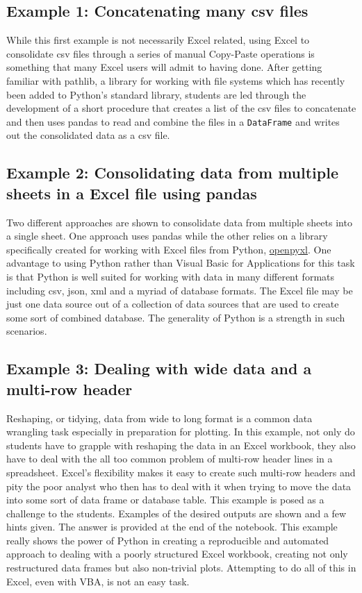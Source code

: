 \documentclass[ited,blindrev]{informs3}              %
\newcommand{\code}[1]{\texttt{#1}}
\begin{document}
\subsection{Example 1: Concatenating many csv files}

While this first example is not necessarily Excel related, using Excel to consolidate csv files through a series of manual Copy-Paste operations is something that many Excel users will admit to having done. After getting familiar with pathlib, a library for working with file systems which has recently been added to Python's standard library, students are led through the development of a short procedure that creates a list of the csv files to concatenate and then uses pandas to read and combine the files in a \code{DataFrame} and writes out the consolidated data as a csv file.

\subsection{Example 2: Consolidating data from multiple sheets in a Excel file using pandas}

Two different approaches are shown to consolidate data from multiple sheets into a single sheet. One approach uses pandas while the other relies on a library specifically created for working with Excel files from Python, \href{https://openpyxl.readthedocs.io/en/stable/}{openpyxl}. One advantage to using Python rather than Visual Basic for Applications for this task is that Python is well suited for working with data in many different formats including csv, json, xml and a myriad of database formats. The Excel file may be just one data source out of a collection of data sources that are used to create some sort of combined database. The generality of Python is a strength in such scenarios.

\subsection{Example 3: Dealing with wide data and a multi-row header}

Reshaping, or tidying, data \cite{wickhamTidyData2014} from wide to long format is a common data wrangling task especially in preparation for plotting. In this example, not only do students have to grapple with reshaping the data in an Excel workbook, they also have to deal with the all too common problem of multi-row header lines in a spreadsheet. Excel's flexibility makes it easy to create such multi-row headers and pity the poor analyst who then has to deal with it when trying to move the data into some sort of data frame or database table. This example is posed as a challenge to the students. Examples of the desired outputs are shown and a few hints given. The answer is provided at the end of the notebook. This example really shows the power of Python in creating a reproducible and automated approach to dealing with a poorly structured Excel workbook, creating not only restructured data frames but also non-trivial plots. Attempting to do all of this in Excel, even with VBA, is not an easy task.
\end{document}
